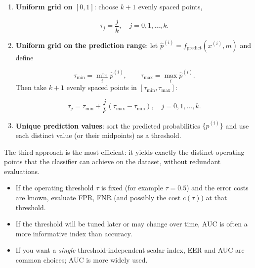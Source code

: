 \begin{enumerate}[noitemsep]
  \item \textbf{Uniform grid on $[0,1]$}: choose $k+1$ evenly spaced points,
  
  $$
    \tau_j = \frac{j}{k}, \quad j = 0, 1, \ldots, k.
  $$
  \item \textbf{Uniform grid on the prediction range}: let $\hat{p}^{(i)} = f_{\text{predict}}(x^{(i)}, m)$ and define
  
  $$
    \tau_{\min} = \min_i \hat{p}^{(i)}, \qquad \tau_{\max} = \max_i \hat{p}^{(i)}.
  $$
  Then take $k+1$ evenly spaced points in $[\tau_{\min}, \tau_{\max}]$:

  $$
    \tau_j = \tau_{\min} + \frac{j}{k}(\tau_{\max} - \tau_{\min}), \quad j = 0, 1, \ldots, k.
  $$
  \item \textbf{Unique prediction values}: sort the predicted probabilities $\{\hat{p}^{(i)}\}$ and use each distinct value (or their midpoints) as a threshold.
\end{enumerate}

\smallskip

The third approach is the most efficient: it yields exactly the distinct operating points that the classifier can achieve on the dataset, without redundant evaluations.


\begin{warningblock}
  \begin{itemize}
    \item If the operating threshold $\tau$ is fixed (for example $\tau = 0.5$) and the error costs are known, evaluate FPR, FNR (and possibly the cost $c(\tau)$) at that threshold.
    \item If the threshold will be tuned later or may change over time, AUC is often a more informative index than accuracy.
    \item If you want a \emph{single} threshold-independent scalar index, EER and AUC are common choices; AUC is more widely used.
  \end{itemize}
\end{warningblock}

\vspace{-1em}

